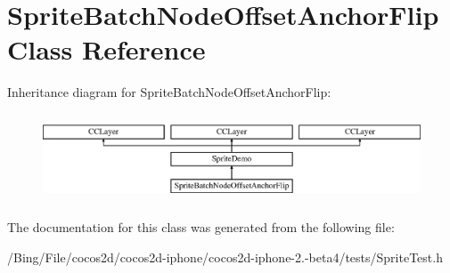 \hypertarget{interface_sprite_batch_node_offset_anchor_flip}{\section{Sprite\-Batch\-Node\-Offset\-Anchor\-Flip Class Reference}
\label{interface_sprite_batch_node_offset_anchor_flip}
}
Inheritance diagram for Sprite\-Batch\-Node\-Offset\-Anchor\-Flip\-:\begin{figure}[H]
\begin{center}
\leavevmode
\includegraphics[height=2.641510cm]{interface_sprite_batch_node_offset_anchor_flip}
\end{center}
\end{figure}


The documentation for this class was generated from the following file\-:\begin{DoxyCompactItemize}
\item 
/\-Bing/\-File/cocos2d/cocos2d-\/iphone/cocos2d-\/iphone-\/2.-\/beta4/tests/Sprite\-Test.\-h\end{DoxyCompactItemize}
